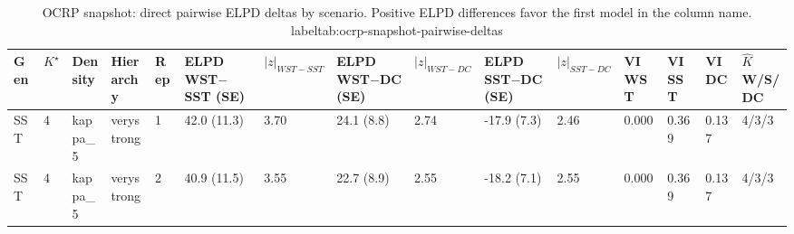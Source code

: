 \begin{table}[!h]
\centering
\caption{OCRP snapshot: direct pairwise ELPD deltas by scenario. Positive ELPD differences favor the first model in the column name.\\label{tab:ocrp-snapshot-pairwise-deltas}}
\centering
\begin{tabular}[t]{lllllllllllllll}
\toprule
Gen & $K^\star$ & Density & Hierarchy & Rep & ELPD WST$-$SST (SE) & $|z|_{WST-SST}$ & ELPD WST$-$DC (SE) & $|z|_{WST-DC}$ & ELPD SST$-$DC (SE) & $|z|_{SST-DC}$ & VI WST & VI SST & VI DC & $\hat K$ W/S/DC\\
\midrule
SST & 4 & kappa_5 & verystrong & 1 & 42.0 (11.3) & 3.70 & 24.1 (8.8) & 2.74 & -17.9 (7.3) & 2.46 & 0.000 & 0.369 & 0.137 & 4/3/3\\
SST & 4 & kappa_5 & verystrong & 2 & 40.9 (11.5) & 3.55 & 22.7 (8.9) & 2.55 & -18.2 (7.1) & 2.55 & 0.000 & 0.369 & 0.137 & 4/3/3\\
\bottomrule
\end{tabular}
\end{table}

